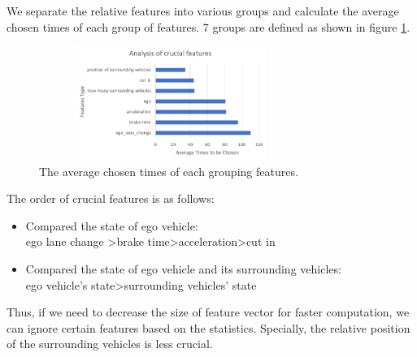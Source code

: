 \documentclass[conference]{IEEEtran}
\begin{document}
We separate the relative features into various groups and calculate the average chosen times of each group of features. 7 groups are defined as shown in figure \ref{fig:analysis_crucial_features}.
  
\begin{figure}[!h]
  \centering
  \includegraphics[width=8.5cm,height=3.7cm]{./images/AnalysisCrucialFeatures.png}
  \caption{The average chosen times of each grouping features. }
  \label{fig:analysis_crucial_features}
  \end{figure}

The order of crucial features is as follows:
\begin{itemize}
    \item Compared the state of ego vehicle:\\ego lane change \textgreater brake time\textgreater acceleration\textgreater cut in
    \item Compared the state of ego vehicle and its surrounding vehicles:\\
ego vehicle's state\textgreater  surrounding vehicles' state
\end{itemize}

Thus, if we need to decrease the size of feature vector for faster computation, we can ignore certain features based on the statistics. Specially, the relative position of the surrounding vehicles is less crucial.
%
%
\end{document}

